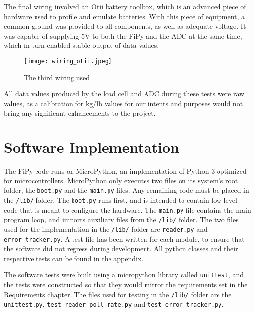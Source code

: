 The final wiring involved an Otii battery toolbox, which is an advanced piece of hardware used to profile and emulate batteries.\cite{otii-web} With this piece of equipment, a common ground was provided to all components, as well as adequate voltage. It was capable of supplying 5V to both the FiPy and the ADC at the same time, which in turn enabled stable output of data values. 
\begin{figure}[H]
	\centering
	\texttt{[image: wiring\_otii.jpeg]}
	\caption{The third wiring used\cite{lucid-chart}}
	\label{fig:wiring_otii}
\end{figure}

All data values produced by the load cell and ADC during these tests were raw values, as a calibration for kg/lb values for our intents and purposes would not bring any significant enhancements to the project.

\section{Software Implementation}
The FiPy code runs on MicroPython, an implementation of Python 3 optimized for microcontrollers. MicroPython only executes two files on its system's root folder, the \lstinline{boot.py} and the \lstinline{main.py} files. Any remaining code must be placed in the \lstinline{/lib/} folder. The \lstinline{boot.py} runs first, and is intended to contain low-level code that is meant to configure the hardware. The \lstinline{main.py} file contains the main program loop, and imports auxiliary files from the \lstinline{/lib/} folder.
The two files used for the implementation in the \lstinline{/lib/} folder are \lstinline{reader.py} and \lstinline{error_tracker.py}. A test file has been written for each module, to ensure that the software did not regress during development. All python classes and their respective tests can be found in the appendix. 

The software tests were built using a micropython library called \lstinline{unittest}, and the tests were constructed so that they would mirror the requirements set in the Requirements chapter. The files used for testing in the \lstinline{/lib/} folder are the \lstinline{unittest.py}, \lstinline{test_reader_poll_rate.py} and \lstinline{test_error_tracker.py}.